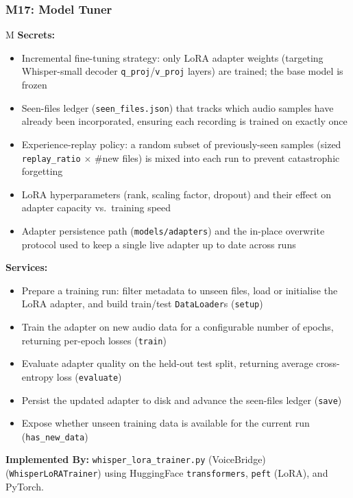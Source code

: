 \documentclass[12pt, titlepage]{article}
\newcounter{mnum}
\newcommand{\mthemnum}{M\themnum}
\begin{document}
\subsubsection*{M17: Model Tuner} \mthemnum\label{M17}
\textbf{Secrets:}
\begin{itemize}
  \item Incremental fine-tuning strategy: only LoRA adapter weights (targeting Whisper-small decoder \texttt{q\_proj}/\texttt{v\_proj} layers) are trained; the base model is frozen
  \item Seen-files ledger (\texttt{seen\_files.json}) that tracks which audio samples have already been incorporated, ensuring each recording is trained on exactly once
  \item Experience-replay policy: a random subset of previously-seen samples (sized \texttt{replay\_ratio} $\times$ \#new files) is mixed into each run to prevent catastrophic forgetting
  \item LoRA hyperparameters (rank, scaling factor, dropout) and their effect on adapter capacity vs.\ training speed
  \item Adapter persistence path (\texttt{models/adapters}) and the in-place overwrite protocol used to keep a single live adapter up to date across runs
\end{itemize}
\textbf{Services:}
\begin{itemize}
  \item Prepare a training run: filter metadata to unseen files, load or initialise the LoRA adapter, and build train/test \texttt{DataLoader}s (\texttt{setup})
  \item Train the adapter on new audio data for a configurable number of epochs, returning per-epoch losses (\texttt{train})
  \item Evaluate adapter quality on the held-out test split, returning average cross-entropy loss (\texttt{evaluate})
  \item Persist the updated adapter to disk and advance the seen-files ledger (\texttt{save})
  \item Expose whether unseen training data is available for the current run (\texttt{has\_new\_data})
\end{itemize}
\textbf{Implemented By:} \texttt{whisper\_lora\_trainer.py} (VoiceBridge) (\texttt{WhisperLoRATrainer}) using HuggingFace \texttt{transformers}, \texttt{peft} (LoRA), and PyTorch.

\medskip
\end{document}
